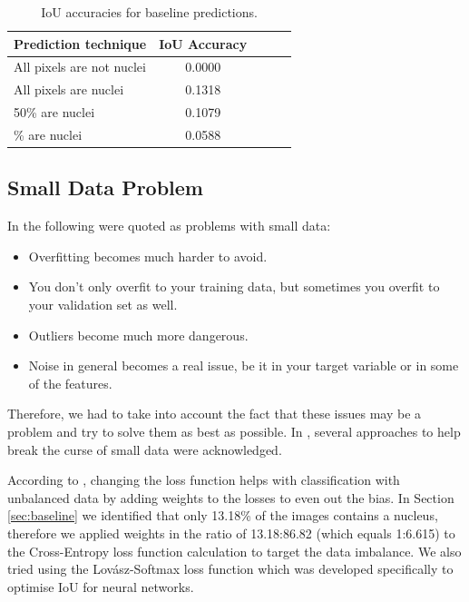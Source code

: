 \documentclass{article}
\begin{document}
\begin{table}[htbp]
\vskip 3mm
\begin{center}
\begin{small}
\begin{sc}
\begin{tabular}{lcccr}
\hline
\abovespace\belowspace
Prediction technique & IoU Accuracy \\
\hline
\abovespace
All pixels are not nuclei & 0.0000 \\
All pixels are nuclei & 0.1318 \\
50\% are nuclei & 0.1079 \\
\belowspace
13.8\% are nuclei & 0.0588 \\
\hline
\end{tabular}
\end{sc}
\end{small}
\caption{IoU accuracies for baseline predictions.}
\label{tab:random_baseline}
\end{center}
\vskip -3mm
\end{table}

\subsection{Small Data Problem}
In \cite{WTDwSmallData} the following were quoted as problems with small data:
\begin{itemize}
    \item Overfitting becomes much harder to avoid.
    \item You don’t only overfit to your training data, but sometimes you overfit to your validation set as well.
    \item Outliers become much more dangerous.
    \item Noise in general becomes a real issue, be it in your target variable or in some of the features.
\end{itemize}
Therefore, we had to take into account the fact that these issues may be a problem and try to solve them as best as possible. In \cite{SmallDataCurse}, several approaches to help break the curse of small data were acknowledged. 

According to \cite{SmallDataCurse}, changing the loss function helps with classification with unbalanced data by adding weights to the losses to even out the bias. In Section \ref{sec:baseline} we identified that only 13.18\% of the images contains a nucleus, therefore we applied weights in the ratio of 13.18:86.82 (which equals 1:6.615) to the Cross-Entropy loss function calculation to target the data imbalance. We also tried using the Lovász-Softmax loss function \cite{berman2018lovasz} which was developed specifically to optimise IoU for neural networks.
\end{document}
